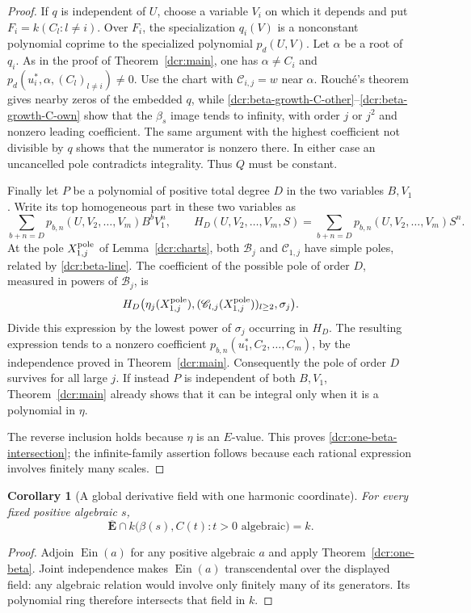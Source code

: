 \documentclass[11pt]{article}
\newtheorem{corollary}[theorem]{Corollary}
\theoremstyle{definition}
\theoremstyle{remark}
\newcommand{\Ebar}{\overline{\mathbf E}}
\newcommand{\Ein}{\operatorname{Ein}}
\begin{document}
\begin{proof}
If $q$ is independent of $U$, choose a variable $V_i$ on which it
depends and put $F_i=k(C_l:l\ne i)$. Over $F_i$, the specialization
$q_i(V)$ is a nonconstant polynomial coprime to the specialized
polynomial $p_d(U,V)$. Let $\alpha$ be a root of $q_i$. As in the
proof of Theorem~\ref{dcr:main}, one has $\alpha\ne C_i$ and
$p_d(u_i^*,\alpha,(C_l)_{l\ne i})\ne0$. Use the chart with
$\mathscr C_{i,j}=w$ near $\alpha$. Rouch\'e's theorem gives nearby
zeros of the embedded $q$, while
\eqref{dcr:beta-growth-C-other}--\eqref{dcr:beta-growth-C-own} show
that the $\beta_s$ image tends to infinity, with order $j$ or $j^2$
and nonzero leading coefficient. The same argument with the highest
coefficient not divisible by $q$ shows that the numerator is nonzero there.
In either case an uncancelled pole contradicts integrality. Thus $Q$
must be constant.

Finally let $P$ be a polynomial of positive total degree $D$ in the
two variables $B,V_1$. Write its top homogeneous part in these two
variables as
\[
 \sum_{b+n=D}p_{b,n}(U,V_2,\ldots,V_m)B^bV_1^n,
 \qquad
 H_D(U,V_2,\ldots,V_m,S)
       =\sum_{b+n=D}p_{b,n}(U,V_2,\ldots,V_m)S^n.
\]
At the pole $X_{1,j}^{\rm pole}$ of Lemma~\ref{dcr:charts}, both
$\mathscr B_j$ and $\mathscr C_{1,j}$ have simple poles, related by
\eqref{dcr:beta-line}. The coefficient of the possible pole of order
$D$, measured in powers of $\mathscr B_j$, is
\[
 H_D\bigl(\eta_j(X_{1,j}^{\rm pole}),
       (\mathscr C_{l,j}(X_{1,j}^{\rm pole}))_{l\ge2},\sigma_j\bigr).
\]
Divide this expression by the lowest power of $\sigma_j$ occurring
in $H_D$. The resulting expression tends to a nonzero coefficient
$p_{b,n}(u_1^*,C_2,\ldots,C_m)$, by the independence proved in
Theorem~\ref{dcr:main}. Consequently the pole of order $D$ survives
for all large $j$. If instead $P$ is independent of both $B,V_1$,
Theorem~\ref{dcr:main} already shows that it can be integral only
when it is a polynomial in $\eta$.

The reverse inclusion holds because $\eta$ is an $E$-value. This
proves \eqref{dcr:one-beta-intersection}; the infinite-family assertion
follows because each rational expression involves finitely many scales.
\end{proof}

\begin{corollary}[A global derivative field with one harmonic coordinate]
\label{dcr:one-beta-global}
For every fixed positive algebraic $s$,
\[
 \Ebar\cap
 k\bigl(\beta(s),C(t):t>0\text{ algebraic}\bigr)=k.
\]
\end{corollary}
\begin{proof}
Adjoin $\Ein(a)$ for any positive algebraic $a$ and apply
Theorem~\ref{dcr:one-beta}. Joint independence makes $\Ein(a)$
transcendental over the displayed field: any algebraic relation would
involve only finitely many of its generators. Its polynomial ring
therefore intersects that field in $k$.
\end{proof}
\end{document}

